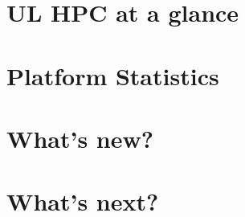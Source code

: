 \documentclass{article}
\begin{document}
\ulhpctoc

\begin{welcome}
  
\end{welcome}


\section{\faCommentAlt\ UL HPC at a glance}

\clearpage

\section{\faBarChart\ Platform Statistics}








\section{\faBullhorn\ What's new?}




\clearpage




\section{\faTime\ What's next?}


\clearpage






\end{document}
